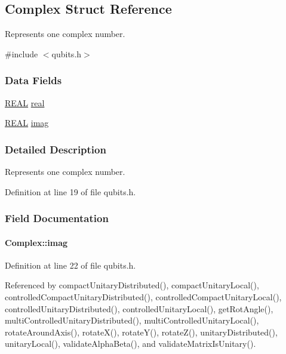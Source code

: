 \hypertarget{structComplex}{}\subsection{Complex Struct Reference}
\label{structComplex}


Represents one complex number.  




{\ttfamily \#include $<$qubits.\+h$>$}

\subsubsection*{Data Fields}
\begin{DoxyCompactItemize}
\item 
\hyperlink{precision_8h_a4b654506f18b8bfd61ad2a29a7e38c25}{R\+E\+AL} \hyperlink{structComplex_a479ad939835457595fcca3ca55c06283}{real}
\item 
\hyperlink{precision_8h_a4b654506f18b8bfd61ad2a29a7e38c25}{R\+E\+AL} \hyperlink{structComplex_a1151948284b21c0052f203f23ab931d9}{imag}
\end{DoxyCompactItemize}


\subsubsection{Detailed Description}
Represents one complex number. 

Definition at line 19 of file qubits.\+h.



\subsubsection{Field Documentation}
\paragraph[{\texorpdfstring{imag}{imag}}]{ Complex\+::imag}\hypertarget{structComplex_a1151948284b21c0052f203f23ab931d9}{}\label{structComplex_a1151948284b21c0052f203f23ab931d9}


Definition at line 22 of file qubits.\+h.



Referenced by compact\+Unitary\+Distributed(), compact\+Unitary\+Local(), controlled\+Compact\+Unitary\+Distributed(), controlled\+Compact\+Unitary\+Local(), controlled\+Unitary\+Distributed(), controlled\+Unitary\+Local(), get\+Rot\+Angle(), multi\+Controlled\+Unitary\+Distributed(), multi\+Controlled\+Unitary\+Local(), rotate\+Around\+Axis(), rotate\+X(), rotate\+Y(), rotate\+Z(), unitary\+Distributed(), unitary\+Local(), validate\+Alpha\+Beta(), and validate\+Matrix\+Is\+Unitary().

